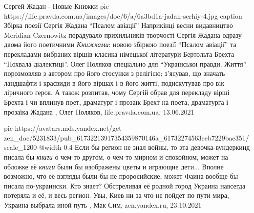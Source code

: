 Сергей Жадан - Новые Книжки
\ifcmt
  pic https://life.pravda.com.ua/images/doc/6/a/6a3bd1a-jadan-serhiy-4.jpg
	caption Збірка поезії Сергія Жадана \enquote{Псалом авіації}
\fi
Наприкінці весни видавництво Meridian Czernowitz порадувало прихильників
творчості Сергія Жадана одразу двома його поетичними \emph{Книжками}: новою збіркою
поезії \enquote{Псалом авіації} та перекладами вибраних віршів класика німецької
літератури Бертольта Брехта \enquote{Похвала діалектиці}.  Олег Поляков спеціально для
\enquote{Української правди. Життя} порозмовляв з автором про його стосунки з релігією;
з'ясував, що значать ландшафти і краєвиди в його віршах і в його житті;
подискутував про вік ліричного героя. А також розпитав, чому Сергій обрав для
перекладу вірші Брехта і чи вплинув поет, драматург і прозаїк Брехт на поета,
драматурга і прозаїка Жадана
, 
Олег Поляков, life.pravda.com.ua, 13.06.2021

\ifcmt
  pic https://avatars.mds.yandex.net/get-zen_doc/5231833/pub_61732213917354359870146a_61732274563eeb7229bae351/scale_1200
  @width 0.4
\fi
Если бы регион не знал войны, то эта девочка-вундеркинд писала бы \emph{книги}
о чем-то другом, о чем-то мирном и спокойном, может на обложке её \emph{книги}
были бы изображены цветы и играющие дети...  Вполне возможно, что её взгляды
были бы не проросийские, может Фаина вообще бы писала по-украински. Кто знает?
Обстреливая её родной город Украина навсегда потеряла и её, и весь регион.
Увы, Киев ни за что не пойдет по пути мира, Украина выбрала иной путь
, Мак Сим, zen.yandex.ru, 23.10.2021

